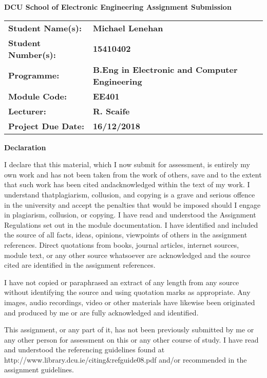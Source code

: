 \documentclass[12pt,a4paper]{scrartcl}
\begin{document}
\begin{titlepage}
  \begin{center}
    \vspace{1cm}
    {\Large\textbf{DCU School of Electronic Engineering Assignment Submission}}

    \vspace{0.5cm}
    \begin{tabu}{ X[l] X[2l] }
      \textbf{Student Name(s):} & \textbf{Michael Lenehan} \\
      \textbf{Student Number(s):} & \textbf{15410402} \\
      \textbf{Programme:} & \textbf{B.Eng in Electronic and Computer Engineering} \\
      \textbf{Module Code:} & \textbf{EE401} \\
      \textbf{Lecturer:} & \textbf{R. Scaife} \\    
      \textbf{Project Due Date:} & \textbf{16/12/2018}
    \end{tabu}

    \vspace{0.5cm}
    \textbf{Declaration}
 \end{center}
    \begin{bfseries}
    I declare that this material, which I now submit for assessment, is entirely
    my own work and has not been taken from the work of others, save and to the
    extent that such work has been cited andacknowledged within the text of my
    work. I understand thatplagiarism, collusion, and copying is a grave and
    serious offence in the university and accept the penalties that would be
    imposed should I engage in plagiarism, collusion, or copying. I have read
    and understood the Assignment Regulations set out in the module documentation.
    I have identified and included the source of all facts, ideas, opinions,
    viewpoints of others in the assignment references. Direct quotations from
    books, journal articles, internet sources, module text, or any other source
    whatsoever are acknowledged and the source cited are identified in the
    assignment references. 
    
    I have not copied or paraphrased an extract of any
    length from any source without identifying the source and using quotation
    marks as appropriate. Any images, audio recordings, video or other materials
    have likewise been originated and produced by me or are fully acknowledged
    and identified.
    
    This assignment, or any part of it, has not been previously
    submitted by me or any other person for assessment on this or any other 
    course of study. I have read and understood the referencing guidelines found
    at http://www.library.dcu.ie/citing\&refguide08.pdf and/or recommended in the
    assignment guidelines. 
    

\end{bfseries}
\end{titlepage}
\end{document}
